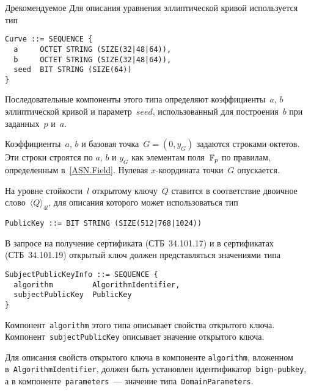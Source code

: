 \begin{appendix}{Д}{рекомендуемое}
Для описания уравнения эллиптической кривой используется тип
\begin{verbatim}
Curve ::= SEQUENCE {
  a     OCTET STRING (SIZE(32|48|64)),
  b     OCTET STRING (SIZE(32|48|64)),
  seed  BIT STRING (SIZE(64))
}
\end{verbatim}

Последовательные компоненты этого типа определяют 
коэффициенты~$a$, $b$ эллиптической кривой и параметр~$seed$,
использованный для построения~$b$ при заданных~$p$ и~$a$.

Коэффициенты~$a$, $b$ и базовая точка~$G=(0,y_G)$ 
задаются строками октетов.
%
Эти строки строятся по $a$, $b$ и $y_G$ как элементам поля~$\mathbb{F}_p$
по правилам, определенным в~\ref{ASN.Field}. 
Нулевая $x$-координата точки~$G$ опускается.

\label{ASN.PubKey}

На уровне стойкости~$l$ открытому ключу~$Q$ 
ставится в соответствие двоичное слово~$\langle Q\rangle_{4l}$,
для описания которого может использоваться тип
\begin{verbatim}
PublicKey ::= BIT STRING (SIZE(512|768|1024))
\end{verbatim}

В запросе на получение сертификата (СТБ~34.101.17) 
и в сертификатах (СТБ~34.101.19)
открытый ключ должен представляться значениями типа
\begin{verbatim}
SubjectPublicKeyInfo ::= SEQUENCE {
  algorithm         AlgorithmIdentifier,
  subjectPublicKey  PublicKey
}
\end{verbatim}

Компонент~\texttt{algorithm} этого типа 
описывает свойства открытого ключа.
Компонент~\texttt{subjectPublicKey} 
описывает значение открытого ключа.

Для описания свойств открытого ключа в компоненте
\texttt{algorithm}, вложенном в~\texttt{AlgorithmIdentifier},
должен быть установлен идентификатор~\texttt{bign-pubkey},
а в компоненте~\texttt{parameters}~--- значение 
типа~\texttt{DomainParameters}.

%
%
%


\end{appendix}
